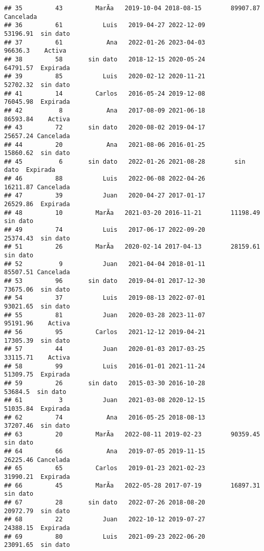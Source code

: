 \documentclass[
]{article}
\begin{document}
\begin{verbatim}
## 35         43         MarÃ­a   2019-10-04 2018-08-15        89907.87 Cancelada
## 36         61           Luis   2019-04-27 2022-12-09        53196.91  sin dato
## 37         61            Ana   2022-01-26 2023-04-03         96636.3    Activa
## 38         58       sin dato   2018-12-15 2020-05-24        64791.57  Expirada
## 39         85           Luis   2020-02-12 2020-11-21        52702.32  sin dato
## 41         14         Carlos   2016-05-24 2019-12-08        76045.98  Expirada
## 42          8            Ana   2017-08-09 2021-06-18        86593.84    Activa
## 43         72       sin dato   2020-08-02 2019-04-17        25657.24 Cancelada
## 44         20            Ana   2021-08-06 2016-01-25        15860.62  sin dato
## 45          6       sin dato   2022-01-26 2021-08-28        sin dato  Expirada
## 46         88           Luis   2022-06-08 2022-04-26        16211.87 Cancelada
## 47         39           Juan   2020-04-27 2017-01-17        26529.86  Expirada
## 48         10         MarÃ­a   2021-03-20 2016-11-21        11198.49  sin dato
## 49         74           Luis   2017-06-17 2022-09-20        25374.43  sin dato
## 51         26         MarÃ­a   2020-02-14 2017-04-13        28159.61  sin dato
## 52          9           Juan   2021-04-04 2018-01-11        85507.51 Cancelada
## 53         96       sin dato   2019-04-01 2017-12-30        73675.06  sin dato
## 54         37           Luis   2019-08-13 2022-07-01        93021.65  sin dato
## 55         81           Juan   2020-03-28 2023-11-07        95191.96    Activa
## 56         95         Carlos   2021-12-12 2019-04-21        17305.39  sin dato
## 57         44           Juan   2020-01-03 2017-03-25        33115.71    Activa
## 58         99           Luis   2016-01-01 2021-11-24        51309.75  Expirada
## 59         26       sin dato   2015-03-30 2016-10-28         53684.5  sin dato
## 61          3           Juan   2021-03-08 2020-12-15        51035.84  Expirada
## 62         74            Ana   2016-05-25 2018-08-13        37207.46  sin dato
## 63         20         MarÃ­a   2022-08-11 2019-02-23        90359.45  sin dato
## 64         66            Ana   2019-07-05 2019-11-15        26225.46 Cancelada
## 65         65         Carlos   2019-01-23 2021-02-23        31990.21  Expirada
## 66         45         MarÃ­a   2022-05-28 2017-07-19        16897.31  sin dato
## 67         28       sin dato   2022-07-26 2018-08-20        20972.79  sin dato
## 68         22           Juan   2022-10-12 2019-07-27        24388.15  Expirada
## 69         80           Luis   2021-09-23 2022-06-20        23091.65  sin dato

\end{verbatim}
\end{document}
